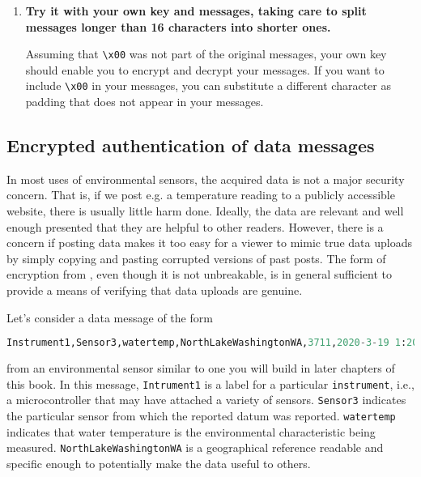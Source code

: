 \begin{enumerate}
	In this command sequence, the key is used to decrypt \lstinline{msg1} and  \lstinline{msg1} into the bytes from which they were generated.
	Those bytes are then converted back to strings, and the ``padding'' characters \lstinline{\x00} are removed.

	The output from the decryption commands should be
\begin{lstlisting}[language=Python]
data1= input plaintext
data2= input pl
\end{lstlisting}
	which successfully recovers the original messages.
	
	\item \textbf{Try it with your own key and messages, taking care to split messages longer than 16 characters into shorter ones.}
	
	Assuming that \lstinline{\x00} was not part of the original messages, your own key should enable you to encrypt and decrypt your messages.
	If you want to include \lstinline{\x00} in your messages, you can substitute a different character as padding that does not appear in your messages. 
\end{enumerate}


\subsection{Encrypted authentication of data messages}
In most uses of environmental sensors, the acquired data is not a major security concern.  
That is, if we post e.g. a temperature reading to a publicly accessible website, there is usually little harm done.
Ideally, the data are relevant and well enough presented that they are helpful to other readers.
However, there is a concern if posting data makes it too easy for a viewer to mimic true data uploads by simply copying and pasting corrupted versions of past posts.
The form of encryption from , even though it is not unbreakable, is in general sufficient to provide a means of verifying that data uploads are genuine.

Let's consider a data message of the form 
\begin{lstlisting}[language=Python]
Instrument1,Sensor3,watertemp,NorthLakeWashingtonWA,3711,2020-3-19 1:20:17,7.6875
\end{lstlisting}
from an environmental sensor similar to one you will build in later chapters of this book.
In this message, \lstinline{Intrument1} is a label for a particular \texttt{instrument}, i.e., a microcontroller that may have attached a variety of sensors.
\lstinline{Sensor3} indicates the particular sensor from which the reported datum was reported.
\lstinline{watertemp} indicates that water temperature is the environmental characteristic being measured.
\lstinline{NorthLakeWashingtonWA} is a geographical reference readable and specific enough to potentially make the data useful to others. 

